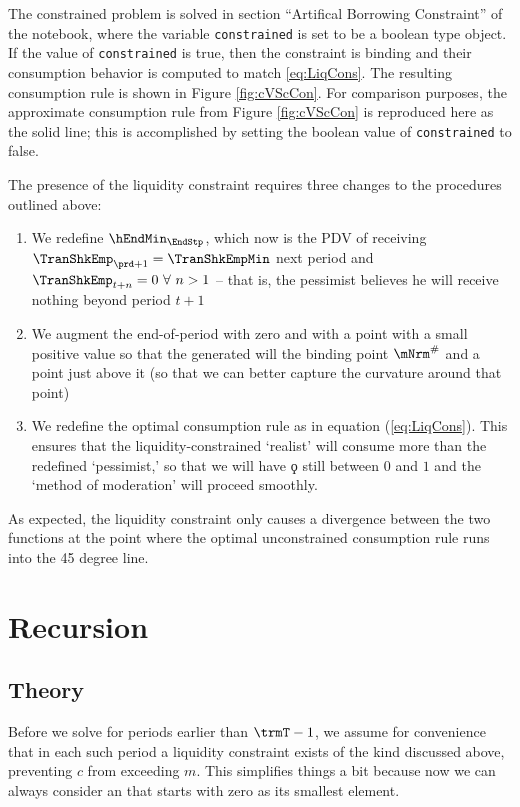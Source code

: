 The constrained problem is solved in section ``Artifical Borrowing Constraint''
of the notebook, where the variable
\texttt{constrained} is set to be a boolean type object. If the value of \texttt{constrained}
is true, then the constraint is binding and their consumption behavior is computed to match
\eqref{eq:LiqCons}. The resulting consumption rule is shown in Figure \ref{fig:cVScCon}. For comparison purposes,
the approximate consumption rule from Figure \ref{fig:cVScCon} is
reproduced here as the solid line; this is accomplished by setting the boolean value
of \texttt{constrained} to false.

The presence of the liquidity
constraint requires three changes to the procedures outlined above:
\begin{enumerate}
\item We redefine
  $\hEndMin_{\EndStp}$, which now is the PDV of receiving
  $\TranShkEmp_{\prd+1}=\TranShkEmpMin$ next period and
  $\TranShkEmp_{t+n}=0~\forall~n>1$ -- that is, the pessimist believes he
  will receive nothing beyond period $t+1$
\item We augment the end-of-period  with zero and with a point with a small positive value so that the generated
  {\mVec} will the binding point $\mNrm^{\#}$ and a point just above it (so that we can better capture the curvature
  around that point)
\item We redefine the optimal consumption rule as
  in equation (\ref{eq:LiqCons}).  This ensures that the
  liquidity-constrained `realist' will consume more than the redefined
  `pessimist,' so that we will have $\koppa$ still between $0$ and $1$
  and the `method of moderation' will proceed smoothly.
\end{enumerate}

As expected, the liquidity constraint only causes a divergence between the two functions at the point where the optimal unconstrained consumption rule runs into the 45 degree line.

\hypertarget{recursion}{}
\section{Recursion}\label{sec:recursion}

\hypertarget{theory}{}
\subsection{Theory}
Before we solve for periods earlier than $\trmT-1$, we assume for
convenience that in each such period a liquidity constraint exists of
the kind discussed above, preventing $c$ from exceeding $m$. This
simplifies things a bit because now we can always consider an
 that starts with zero as its smallest element.

